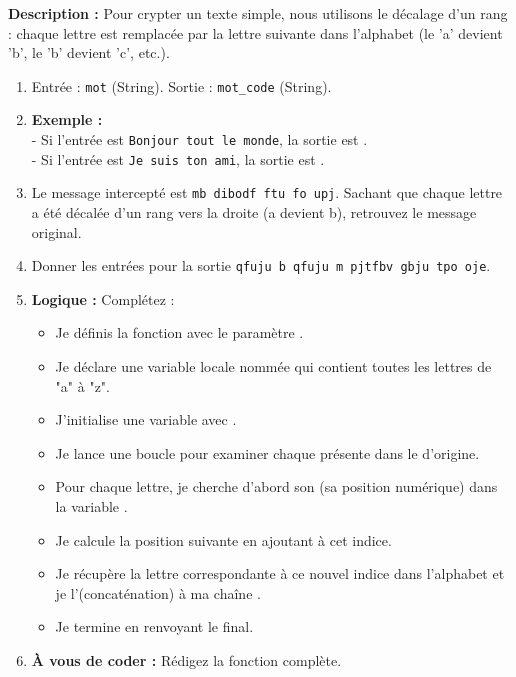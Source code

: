 \begin{Exercise}[title={La fonction \texttt{code\_cesar\_un} (Complexe) }]
\textbf{Description :} Pour crypter un texte simple, nous utilisons le décalage d'un rang : chaque lettre est remplacée par la lettre suivante dans l'alphabet (le 'a' devient 'b', le 'b' devient 'c', etc.).
\begin{enumerate}
    \item Entrée : \texttt{mot} (String). Sortie : \texttt{mot\_code} (String).
    \item \textbf{Exemple :} \\- Si l'entrée est \texttt{Bonjour tout le monde}, la sortie est \dotfill.\\
    - Si l'entrée est \texttt{Je suis ton ami}, la sortie est \dotfill.
    \item Le message intercepté est \texttt{mb dibodf ftu fo upj}. Sachant que chaque lettre a été décalée d'un rang vers la droite (a devient b), retrouvez le message original.
    \item Donner les entrées pour la sortie \texttt{qfuju b qfuju m pjtfbv gbju tpo oje}.
    \item \textbf{Logique :} Complétez :
    \begin{itemize}
        \item Je définis la fonction \dotfill avec le paramètre \dotfill.
        \item Je déclare une variable locale nommée \dotfill qui contient toutes les lettres de "a" à "z".
        \item J'initialise une variable \dotfill avec \dotfill.
        \item Je lance une boucle pour examiner chaque \dotfill présente dans le \dotfill d'origine.
        \item Pour chaque lettre, je cherche d'abord son \dotfill (sa position numérique) dans la variable \dotfill.
        \item Je calcule la position suivante en ajoutant \dotfill à cet indice.
        \item Je récupère la lettre correspondante à ce nouvel indice dans l'alphabet et je l'\dotfill (concaténation) à ma chaîne \dotfill.
        \item Je termine en renvoyant le \dotfill final.
    \end{itemize}
    \item \textbf{À vous de coder :} Rédigez la fonction complète.
\end{enumerate}
\end{Exercise}

